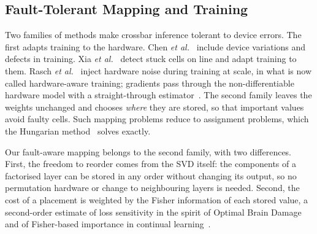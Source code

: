 \subsection{Fault-Tolerant Mapping and Training}
Two families of methods make crossbar inference tolerant to device errors. The first adapts training to
the hardware. Chen \emph{et al.}~\cite{chen2017accelerator} include device variations and defects in
training. Xia \emph{et al.}~\cite{xia2017fault} detect stuck cells on line and adapt training to them.
Rasch \emph{et al.}~\cite{rasch2023hwa} inject hardware noise during training at scale, in what is now
called hardware-aware training; gradients pass through the non-differentiable hardware model with a
straight-through estimator~\cite{bengio2013ste}. The second family leaves the weights unchanged and
chooses \emph{where} they are stored, so that important values avoid faulty cells. Such mapping
problems reduce to assignment problems, which the Hungarian method~\cite{kuhn1955hungarian} solves
exactly.

Our fault-aware mapping belongs to the second family, with two differences. First, the freedom to
reorder comes from the SVD itself: the components of a factorised layer can be stored in any order
without changing its output, so no permutation hardware or change to neighbouring layers is needed.
Second, the cost of a placement is weighted by the Fisher information of each stored value, a
second-order estimate of loss sensitivity in the spirit of Optimal Brain
Damage~\cite{lecun1990obd} and of Fisher-based importance in continual
learning~\cite{kirkpatrick2017ewc}.
